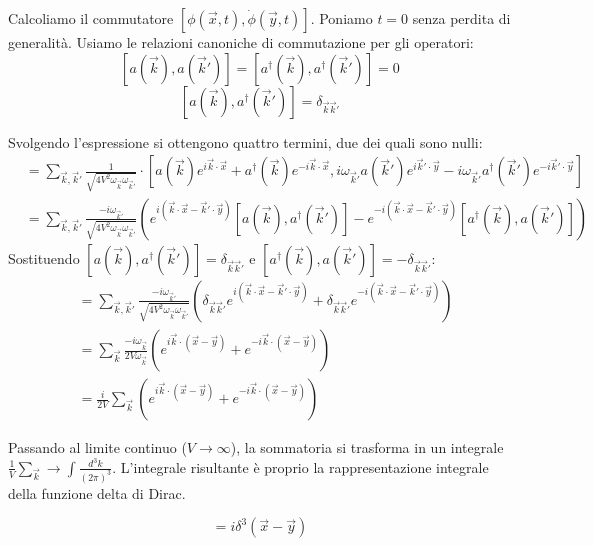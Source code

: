 Calcoliamo il commutatore $[\phi(\vec{x},t), \dot{\phi}(\vec{y},t)]$. Poniamo $t=0$ senza perdita di generalità.
Usiamo le relazioni canoniche di commutazione per gli operatori:
$$[a(\vec{k}), a(\vec{k}')] = [a^{\dagger}(\vec{k}), a^{\dagger}(\vec{k}')] = 0$$
$$[a(\vec{k}), a^{\dagger}(\vec{k}')] = \delta_{\vec{k}\vec{k}'}$$

Svolgendo l'espressione si ottengono quattro termini, due dei quali sono nulli:
\begin{align*}
[\phi(\vec{x},0), \dot{\phi}(\vec{y},0)] &= \sum_{\vec{k},\vec{k}'} \frac{1}{\sqrt{4V^2 \omega_{\vec{k}}\omega_{\vec{k}'}}} \cdot \left[ a(\vec{k})e^{i\vec{k}\cdot\vec{x}} + a^{\dagger}(\vec{k})e^{-i\vec{k}\cdot\vec{x}}, i\omega_{\vec{k}'} a(\vec{k}')e^{i\vec{k}'\cdot\vec{y}} - i\omega_{\vec{k}'} a^{\dagger}(\vec{k}')e^{-i\vec{k}'\cdot\vec{y}} \right] \\
&= \sum_{\vec{k},\vec{k}'} \frac{-i\omega_{\vec{k}'}}{\sqrt{4V^2 \omega_{\vec{k}}\omega_{\vec{k}'}}} \left( e^{i(\vec{k}\cdot\vec{x} - \vec{k}'\cdot\vec{y})} [a(\vec{k}), a^{\dagger}(\vec{k}')] - e^{-i(\vec{k}\cdot\vec{x} - \vec{k}'\cdot\vec{y})} [a^{\dagger}(\vec{k}), a(\vec{k}')] \right)
\end{align*}
Sostituendo $[a(\vec{k}), a^{\dagger}(\vec{k}')] = \delta_{\vec{k}\vec{k}'}$ e $[a^{\dagger}(\vec{k}), a(\vec{k}')] = -\delta_{\vec{k}\vec{k}'}$:
\begin{align*}
&= \sum_{\vec{k},\vec{k}'} \frac{-i\omega_{\vec{k}'}}{\sqrt{4V^2 \omega_{\vec{k}}\omega_{\vec{k}'}}} \left( \delta_{\vec{k}\vec{k}'} e^{i(\vec{k}\cdot\vec{x} - \vec{k}'\cdot\vec{y})} + \delta_{\vec{k}\vec{k}'} e^{-i(\vec{k}\cdot\vec{x} - \vec{k}'\cdot\vec{y})} \right) \\
&= \sum_{\vec{k}} \frac{-i\omega_{\vec{k}}}{2V\omega_{\vec{k}}} \left( e^{i\vec{k}\cdot(\vec{x} - \vec{y})} + e^{-i\vec{k}\cdot(\vec{x} - \vec{y})} \right) \\
&= \frac{i}{2V} \sum_{\vec{k}} \left( e^{i\vec{k}\cdot(\vec{x} - \vec{y})} + e^{-i\vec{k}\cdot(\vec{x} - \vec{y})} \right)
\end{align*}

Passando al limite continuo ($V \to \infty$), la sommatoria si trasforma in un integrale $\frac{1}{V}\sum_{\vec{k}} \to \int \frac{d^3k}{(2\pi)^3}$. L'integrale risultante è proprio la rappresentazione integrale della funzione delta di Dirac.

\begin{equation}
[\phi(\vec{x},t), \dot{\phi}(\vec{y},t)] = i\delta^3(\vec{x}-\vec{y})
\end{equation}

